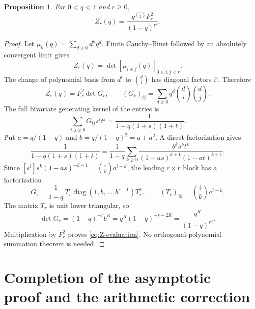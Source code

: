 \documentclass[11pt]{article}
\numberwithin{equation}{section}
\newtheorem{proposition}[proposition]{Proposition}
\theoremstyle{definition}
\newcommand{\diag}{\operatorname{diag}}
\begin{document}
\begin{proposition}\label{prop:geometric}
For $0<q<1$ and $r\geq0$,
\begin{equation}\label{eq:Z-evaluation}
 \boxed{\displaystyle
 Z_r(q)=\frac{q^{\binom r2}F_r^2}{(1-q)^{r^2}}.}
\end{equation}
\end{proposition}

\begin{proof}
Let $\mu_k(q)=\sum_{d\geq0}d^kq^d$. Finite Cauchy--Binet followed by an absolutely convergent limit gives
\begin{equation}\label{eq:hankel}
 Z_r(q)=\det[\mu_{i+j}(q)]_{0\leq i,j<r}.
\end{equation}
The change of polynomial basis from $d^i$ to $\binom di$ has diagonal factors $i!$. Therefore
\[
 Z_r(q)=F_r^2\det G_r,\qquad
 (G_r)_{ij}=\sum_{d\geq0}q^d\binom di\binom dj.
\]
The full bivariate generating kernel of the entries is
\begin{equation}\label{eq:Gkernel}
 \sum_{i,j\geq0}G_{ij}s^it^j=\frac1{1-q(1+s)(1+t)}.
\end{equation}
Put $a=q/(1-q)$ and $b=q/(1-q)^2=a+a^2$. A direct factorization gives
\begin{equation}\label{eq:kernelLDL}
 \frac1{1-q(1+s)(1+t)}
 =\frac1{1-q}\sum_{k\geq0}
 \frac{b^ks^kt^k}{(1-as)^{k+1}(1-at)^{k+1}}.
\end{equation}
Since $[s^i]s^k(1-as)^{-k-1}=\binom ik a^{i-k}$, the leading $r\times r$ block has a factorization
\[
 G_r=\frac1{1-q}\,T_r\diag(1,b,\ldots,b^{r-1})T_r^{\mathsf T},
 \qquad (T_r)_{ik}=\binom ik a^{i-k}.
\]
The matrix $T_r$ is unit lower triangular, so
\[
 \det G_r=(1-q)^{-r}b^R
          =q^R(1-q)^{-r-2R}
          =\frac{q^R}{(1-q)^{r^2}}.
\]
Multiplication by $F_r^2$ proves \eqref{eq:Z-evaluation}. No orthogonal-polynomial summation theorem is needed.
\end{proof}

\section{Completion of the asymptotic proof and the arithmetic correction}\label{sec:completion}
\end{document}
